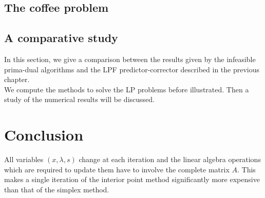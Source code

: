 \documentclass[a4paper,10 pt,titlepage,twoside]{book}
\theoremstyle{plain}
\theoremstyle{definition}
\theoremstyle{remark}
\begin{document}
\section{The coffee problem}
\section{A comparative study}
In this section, we give a comparison between the results given by the infeasible prima-dual algorithms and the LPF predictor-corrector described in the previous chapter.\\ We compute the methods to solve the LP problems before illustrated. Then a study of the numerical results will be discussed.
\chapter{Conclusion}
 All variables $(x, \lambda, s)$ change at each iteration and the linear algebra operations which are required to update them have to involve the complete matrix $A$. This makes a single iteration of the interior point method significantly more expensive than that of the simplex method.
\end{document}
